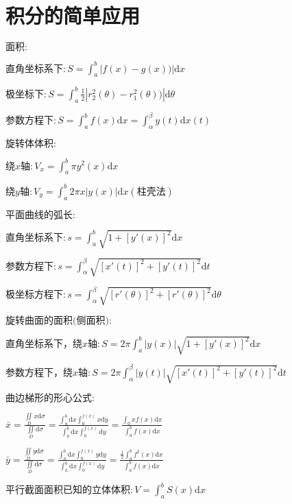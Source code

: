 \section{积分的简单应用}

\begin{spacing}{\hangju}
    \noindent $\mbox{面积}\colon$

    $\mbox{直角坐标系下}\colon S = \int_{a}^{b}{|f(x) - g(x))|\mathrm{d}x}$

    $\mbox{极坐标下}\colon S = \int_{a}^{b}{\frac{1}{2}|r_{2}^{2}(\theta) - r_{1}^{2}(\theta))|\mathrm{d}\theta}$

    $\mbox{参数方程下}\colon S = \int_{a}^{b}{f(x)\mathrm{d}x} =\int_{\alpha}^{\beta}{y(t)\mathrm{d}x(t)}$

    \noindent $\mbox{旋转体体积}\colon$

    $\mbox{绕}x\mbox{轴}\colon V_{x} = \int_{a}^{b}{\pi y^2(x)\mathrm{d}x}$

    $\mbox{绕}y\mbox{轴}\colon V_{y} = \int_{a}^{b}{2\pi x|y(x)|\mathrm{d}x}(\mbox{柱壳法})$

    \noindent $\mbox{平面曲线的弧长}\colon$

    $\mbox{直角坐标系下}\colon s = \int_{a}^{b}{\sqrt{1 + [y'(x)]^2}\mathrm{d}x}$

    $\mbox{参数方程下}\colon s = \int_{\alpha}^{\beta}{\sqrt{[x'(t)]^2 + [y'(t)]^2}\mathrm{d}t}$

    $\mbox{极坐标方程下}\colon s = \int_{\alpha}^{\beta}{\sqrt{[r'(\theta)]^2 + [r'(\theta)]^2}\mathrm{d}\theta}$

    \noindent $\mbox{旋转曲面的面积(侧面积)}\colon$

    $\mbox{直角坐标系下，绕}x\mbox{轴}\colon S = 2\pi\int_{a}^{b}{|y(x)|\sqrt{1 + [y'(x)]^2}\mathrm{d}x}$

    $\mbox{参数方程下，绕}x\mbox{轴}\colon S = 2\pi\int_{\alpha}^{\beta}{|y(t)|\sqrt{[x'(t)]^2 + [y'(t)]^2}\mathrm{d}t}$

    \noindent $\mbox{曲边梯形的形心公式}\colon$

    $\bar{x} = \frac{\iint\limits_D{x\mathrm{d}\sigma}}{\iint\limits_D{\mathrm{d}\sigma}} = \frac{\int_{a}^{b}{\mathrm{d}x}\int_{0}^{f(x)}{x\mathrm{d}y}}{\int_{a}^{b}{\mathrm{d}x}\int_{0}^{f(x)}{\mathrm{d}y}} = \frac{\int_{0}{xf(x)\mathrm{d}x}}{\int_{a}^{b}{f(x)\mathrm{d}x}}$

    $\bar{y} = \frac{\iint\limits_D{y\mathrm{d}\sigma}}{\iint\limits_D{\mathrm{d}\sigma}} = \frac{\int_{a}^{b}{\mathrm{d}x}\int_{0}^{f(x)}{y\mathrm{d}y}}{\int_{a}^{b}{\mathrm{d}x}\int_{0}^{f(x)}{\mathrm{d}y}} = \frac{\frac{1}{2}\int_{a}^{b}{f^{2}(x)\mathrm{d}x}}{\int_{a}^{b}{f(x)\mathrm{d}x}}$

    \noindent $\mbox{平行截面面积已知的立体体积}\colon V = \int_{a}^{b}{S(x)\mathrm{d}x}$
\end{spacing}